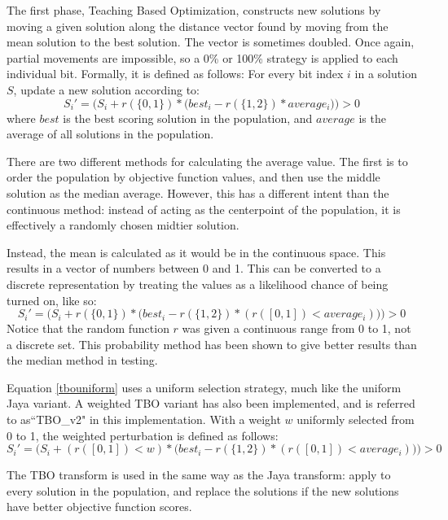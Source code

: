 \documentclass[11pt, letterpaper, onecolumn]{article}
\begin{document}
The first phase, Teaching Based Optimization, constructs new solutions by moving a given solution along the distance vector found by moving from the mean solution to the best solution. The vector is sometimes doubled. Once again, partial movements are impossible, so a 0\% or 100\% strategy is applied to each individual bit. Formally, it is defined as follows: For every bit index $i$ in a solution $S$, update a new solution according to: 
\begin{equation}
S_i' = \Big(S_i + r(\{0, 1\})*\big(best_i - r(\{1, 2\})*average_i\big)\Big) > 0
\end{equation}
where $best$ is the best scoring solution in the population, and $average$ is the average of all solutions in the population. 

There are two different methods for calculating the average value. The first is to order the population by objective function values, and then use the middle solution as the median average. However, this has a different intent than the continuous method: instead of acting as the centerpoint of the population, it is effectively a randomly chosen midtier solution. 

Instead, the mean is calculated as it would be in the continuous space. This results in a vector of numbers between 0 and 1. This can be converted to a discrete representation by treating the values as a likelihood chance of being turned on, like so: 
\begin{equation} \label{tbouniform}
S_i' = \Big(S_i + r(\{0, 1\})*\big(best_i - r(\{1, 2\})*(r([0, 1]) < average_i)\big)\Big) > 0
\end{equation}
Notice that the random function $r$ was given a continuous range from 0 to 1, not a discrete set. This probability method has been shown to give better results than the median method in testing. 

Equation \ref{tbouniform} uses a uniform selection strategy, much like the uniform Jaya variant. A weighted TBO variant has also been implemented, and is referred to as``TBO\_v2" in this implementation. With a weight $w$ uniformly selected from 0 to 1, the weighted perturbation is defined as follows: 
\begin{equation} \label{tboweighted}
S_i' = \Big(S_i + (r([0,1])<w)*\big(best_i - r(\{1, 2\})*(r([0, 1]) < average_i)\big)\Big) > 0
\end{equation}

The TBO transform is used in the same way as the Jaya transform: apply to every solution in the population, and replace the solutions if the new solutions have better objective function scores.
\end{document}
